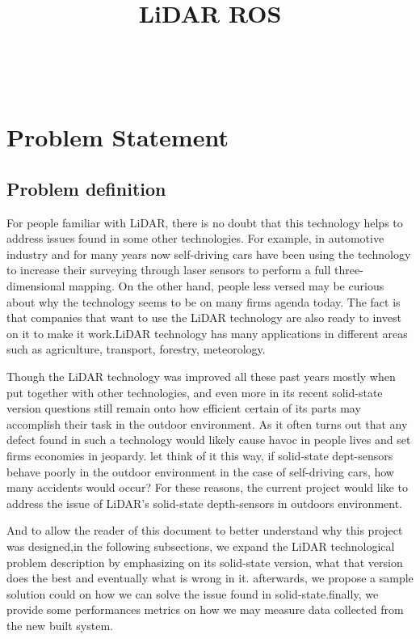 \documentclass[10pt,draftclsnofoot,onecolumn,journal,compsoc]{IEEEtran}
\title{LiDAR ROS }
\author{
	\IEEEauthorblockN{\large Prepared For:\\  D. Kevin McGrath } \\
  \IEEEauthorblockN{\small By: \\ \large  Lucien Tamno} \\
  \IEEEauthorblockA{CS 406: Winter 2018\\ Oregon State University}
}
\date{\displaydate{date}}
\begin{document}
\maketitle
 
\IEEEdisplaynontitleabstractindextext
\IEEEpeerreviewmaketitle
\newpage
{}
\tableofcontents
\newpage

\section{Problem Statement}
\subsection{Problem definition}
For people familiar with LiDAR, there is no doubt that this technology helps to address issues found in some other technologies. For example, in automotive industry and for many years now self-driving cars have been using the technology to increase their surveying through laser sensors to perform a full three-dimensional mapping. On the other hand, people less versed may be curious about why the technology seems to be on many firms agenda today. The fact is that companies that want to use the LiDAR technology  are also ready to invest on it to make it work.LiDAR technology has many applications in different areas such as  agriculture, transport, forestry, meteorology.  

Though the LiDAR technology was improved all these past years mostly when put together with other technologies, and even more in its recent solid-state version questions still remain onto how efficient certain of its parts may accomplish their task in the outdoor environment. As it often turns out that any defect found in such a technology would likely cause havoc in people lives and set firms economies in jeopardy. let think of it this way, if solid-state dept-sensors behave poorly in the outdoor environment in the case of self-driving cars, how many accidents would occur? For these reasons, the current project would like to address the issue of LiDAR's solid-state depth-sensors in outdoors environment. \par

And to allow the reader of this document to better understand why this project was designed,in the following subsections, we expand  the LiDAR technological problem description by emphasizing on its solid-state version, what that version does the best and eventually what is wrong in it. afterwards, we  propose a sample solution could on how we can solve the issue found in solid-state.finally, we provide some performances metrics on how we may measure data collected from the new built system. 
\end{document}
